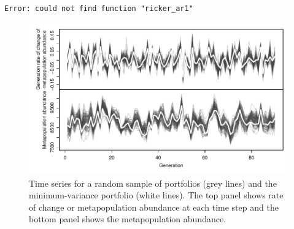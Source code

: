 \documentclass[12pt]{article}
\begin{document}
\begin{verbatim}
Error: could not find function "ricker_ar1"
\end{verbatim}

\begin{figure}[htbp]
\centering
\includegraphics{figure/plot-portfolio-timeseries.pdf}
\caption{Time series for a random sample of portfolios (grey lines) and
the minimum-variance portfolio (white lines). The top panel shows rate
of change or metapopulation abundance at each time step and the bottom
panel shows the metapopulation abundance.}
\end{figure}

\clearpage

\renewcommand\refname{References}

\end{document}
